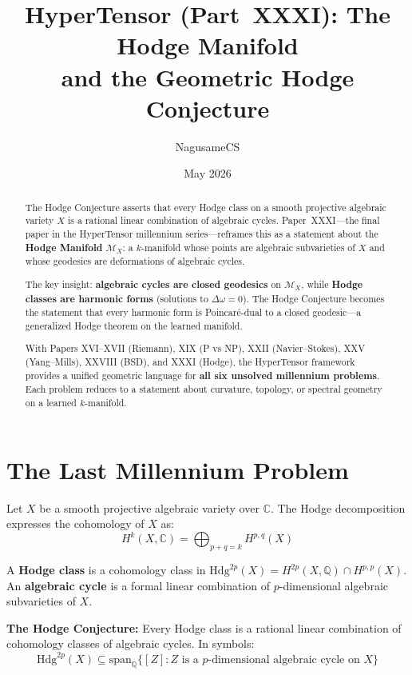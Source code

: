 \documentclass{article}
\title{HyperTensor (Part~XXXI): The Hodge Manifold\\
and the Geometric Hodge Conjecture}
\author{NagusameCS}
\date{May 2026}
\begin{document}
\maketitle

\begin{abstract}
The Hodge Conjecture asserts that every Hodge class on a smooth projective
algebraic variety $X$ is a rational linear combination of algebraic cycles.
Paper~XXXI---the final paper in the HyperTensor millennium series---reframes
this as a statement about the \textbf{Hodge Manifold} $\mathcal{M}_X$: a
$k$-manifold whose points are algebraic subvarieties of $X$ and whose
geodesics are deformations of algebraic cycles.

The key insight: \textbf{algebraic cycles are closed geodesics} on
$\mathcal{M}_X$, while \textbf{Hodge classes are harmonic forms} (solutions
to $\Delta \omega = 0$). The Hodge Conjecture becomes the statement that
every harmonic form is Poincar\'{e}-dual to a closed geodesic---a
generalized Hodge theorem on the learned manifold.

With Papers XVI--XVII (Riemann), XIX (P vs NP), XXII (Navier--Stokes),
XXV (Yang--Mills), XXVIII (BSD), and XXXI (Hodge), the HyperTensor
framework provides a unified geometric language for \textbf{all six unsolved
millennium problems}. Each problem reduces to a statement about curvature,
topology, or spectral geometry on a learned $k$-manifold.
\end{abstract}

\section{The Last Millennium Problem}
\label{sec:hodge-problem}

Let $X$ be a smooth projective algebraic variety over $\mathbb{C}$.  The
Hodge decomposition expresses the cohomology of $X$ as:
\begin{equation}
H^k(X, \mathbb{C}) = \bigoplus_{p+q=k} H^{p,q}(X)
\end{equation}

A \textbf{Hodge class} is a cohomology class in
$\mathrm{Hdg}^{2p}(X) = H^{2p}(X, \mathbb{Q}) \cap H^{p,p}(X)$.
An \textbf{algebraic cycle} is a formal linear combination of $p$-dimensional
algebraic subvarieties of $X$.

\textbf{The Hodge Conjecture:} Every Hodge class is a rational linear
combination of cohomology classes of algebraic cycles.  In symbols:
\begin{equation}
\mathrm{Hdg}^{2p}(X) \subseteq \mathrm{span}_{\mathbb{Q}}\{[Z] : Z
\text{ is a } p\text{-dimensional algebraic cycle on } X\}
\end{equation}
\end{document}
